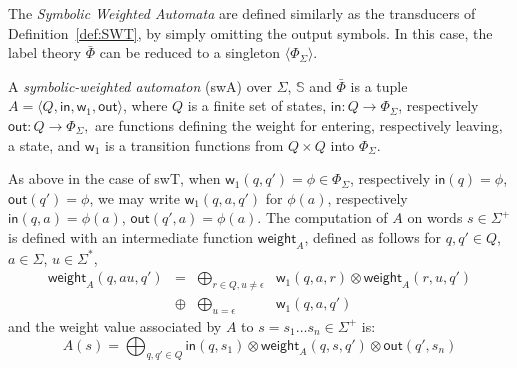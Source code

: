 \documentclass[runningheads]{llncs}
\def\<#1>{\langle #1 \rangle}
\newcommand{\Semiring}{\mathbb{S}}
\newcommand{\zero}{\mathbb{0}}
\newcommand{\one}{\mathbb{1}}
\def\SWT{\textsf{swT}\xspace}
\def\SWA{\textsf{swA}\xspace}
\def\weight{\mathsf{weight}}
\def\wei{\mathsf{w}}
\def\init{\mathsf{in}}
\def\final{\mathsf{out}}
\begin{document}
\noindent
The \emph{Symbolic Weighted Automata} %
are defined similarly as the transducers of Definition~\ref{def:SWT}, 
by simply omitting the output symbols.
%
In this case, the label theory $\bar\Phi$ can be reduced to a singleton $\< \Phi_\Sigma>$.
%
\begin{definition} \label{def:SWA}
A \emph{symbolic-weighted automaton} (\SWA)
over $\Sigma$, $\Semiring$ and $\bar\Phi$
is a tuple
$A = \< Q, \init, {\wei_1}, \final >$,
where $Q$ is a finite set of states, 
$\mathsf{in} : Q \to \Phi_\Sigma$, 
respectively $\mathsf{out} : Q \to \Phi_\Sigma,$
are functions defining the weight for entering, 
respectively leaving, a state, 
and ${\wei_1}$ is a transition functions 
from $Q \times Q$ into $\Phi_{\Sigma}$.
\end{definition}
%      
\noindent
As above in the case of \SWT, 
when $\wei_1(q, q') = \phi \in \Phi_\Sigma$, 
respectively $\mathsf{in}(q) = \phi$, $\mathsf{out}(q') = \phi$,
we may write $\wei_1(q, a, q')$ for $\phi(a)$, 
respectively $\mathsf{in}(q, a) = \phi(a)$, $\mathsf{out}(q', a) = \phi(a)$.
The computation of $A$ on words $s \in \Sigma^+$
is defined with an intermediate function $\weight_A$, 
defined as follows for $q, q' \in Q$, $a \in \Sigma$, $u \in \Sigma^*$,
%
\begin{equation}
\begin{array}{lccl}
\weight_A(q, au, q') & = & 
            \displaystyle\bigoplus_{r \in Q, u \neq \epsilon} &
    \wei_{1}(q, a, r) \otimes \weight_A(r, u, q')\\
  & \oplus & \displaystyle\bigoplus_{u = \epsilon} & 
    \wei_{1}(q, a, q')
\end{array}
\label{eq:SWA-weight}
\end{equation}
%
\noindent
and the weight value associated by $A$ to 
$s = s_1\ldots s_n \in \Sigma^+$ is: %
\begin{equation}
A(s)  = 
\displaystyle\bigoplus_{q, q' \in Q} \mathsf{in}(q, s_1) 
\mathop{\otimes} \weight_A(q, s, q') \mathop{\otimes} \mathsf{out}(q', s_n)
\label{eq:SWA-value}
\end{equation}
\end{document}
